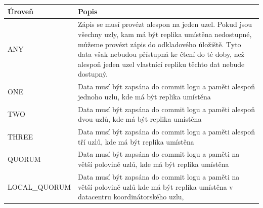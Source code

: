 \begin{table}
\begin{tabularx}{\textwidth}{ |l|X| }

    \hline
    Úroveň       & Popis                                                                                                                                                                                                                                                                                  \\ \hline
    ANY          & Zápis se musí provézt alespon na jeden uzel. Pokud jsou všechny uzly, kam má být replika umístěna nedostupné, můžeme provézt zápis do odkladového úložiště. Tyto data však nebudou přístupná ke čtení do té doby, než alespoň jeden uzel vlastnící repliku těchto dat nebude dostupný. \\ \hline
    ONE          & Data musí být zapsána do commit logu a paměti alespoň jednoho uzlu, kde má být replika umístěna                                                                                                                                                                                        \\ \hline
    TWO          & Data musí být zapsána do commit logu a paměti alespoň dvou uzlů, kde má být replika umístěna                                                                                                                                                                                           \\ \hline
    THREE        & Data musí být zapsána do commit logu a paměti alespoň tří uzlů, kde má být replika umístěna                                                                                                                                                                                            \\ \hline
    QUORUM       & Data musí být zapsána do commit logu a paměti na větší polovině uzlů, kde má být replika umístěna                                                                                                                                                                                      \\ \hline
    LOCAL\_QUORUM & Data musí být zapsána do commit logu a paměti na větší polovině uzlů kde má být replika umístěna v datacentru koordinátorského uzlu,                                                                                                                                                   \\ \hline

\end{tabularx}
\end{table}
